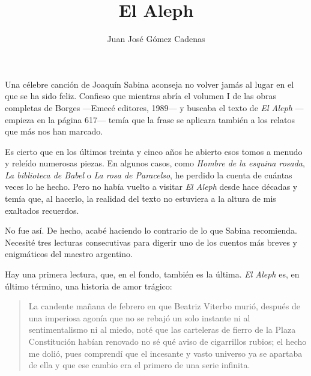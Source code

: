 \documentclass[11pt,a4paper]{article}
\title{El Aleph}
\author{Juan José Gómez Cadenas}
\date{}
\begin{document}
\maketitle

Una célebre canción de Joaquín Sabina aconseja no volver jamás al lugar en el que se ha sido feliz. Confieso que mientras abría el volumen I de las obras completas de Borges ---Emecé editores, 1989--- y buscaba el texto de \emph{El Aleph} ---empieza en la página 617--- temía que la frase se aplicara también a los relatos que más nos han marcado.

Es cierto que en los últimos treinta y cinco años he abierto esos tomos a menudo y releído numerosas piezas. En algunos casos, como \emph{Hombre de la esquina rosada}, \emph{La biblioteca de Babel} o \emph{La rosa de Paracelso}, he perdido la cuenta de cuántas veces lo he hecho. Pero no había vuelto a visitar \emph{El Aleph} desde hace décadas y temía que, al hacerlo, la realidad del texto no estuviera a la altura de mis exaltados recuerdos.

No fue así. De hecho, acabé haciendo lo contrario de lo que Sabina recomienda. Necesité tres lecturas consecutivas para digerir uno de los cuentos más breves y enigmáticos del maestro argentino.

Hay una primera lectura, que, en el fondo, también es la última. \emph{El Aleph} es, en último término, una historia de amor trágico:

\begin{quotation}
La candente mañana de febrero en que Beatriz Viterbo murió, después de una imperiosa agonía que no se rebajó un solo instante ni al sentimentalismo ni al miedo, noté que las carteleras de fierro de la Plaza Constitución habían renovado no sé qué aviso de cigarrillos rubios; el hecho me dolió, pues comprendí que el incesante y vasto universo ya se apartaba de ella y que ese cambio era el primero de una serie infinita.
\end{quotation}
\end{document}
